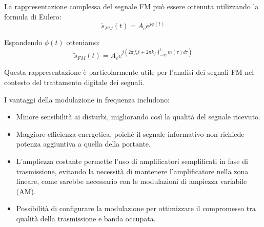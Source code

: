 La rappresentazione complessa del segnale FM può essere ottenuta utilizzando la formula di Eulero:
\begin{equation}
    \tilde{s}_{FM}(t) = A_c e^{j\phi(t)}
\end{equation}

Espandendo \( \phi(t) \) otteniamo:
\begin{equation}
    \tilde{s}_{FM}(t) = A_c e^{j\left(2\pi f_c t + 2\pi k_f \int_{-\infty}^{t} m(\tau) d\tau\right)}
\end{equation}

Questa rappresentazione è particolarmente utile per l'analisi dei segnali FM nel contesto del trattamento digitale dei segnali.

I vantaggi della modulazione in frequenza includono:
\begin{itemize}
    \item Minore sensibilità ai disturbi, migliorando così la qualità del segnale ricevuto.
    \item Maggiore efficienza energetica, poiché il segnale informativo non richiede potenza aggiuntiva a quella della portante.
    \item L'ampliezza costante permette l'uso di amplificatori semplificati in fase di trasmissione, evitando la necessità di mantenere l'amplificatore nella zona lineare, come sarebbe necessario con le modulazioni di ampiezza variabile (AM).
    \item Possibilità di configurare la modulazione per ottimizzare il compromesso tra qualità della trasmissione e banda occupata.
\end{itemize}


